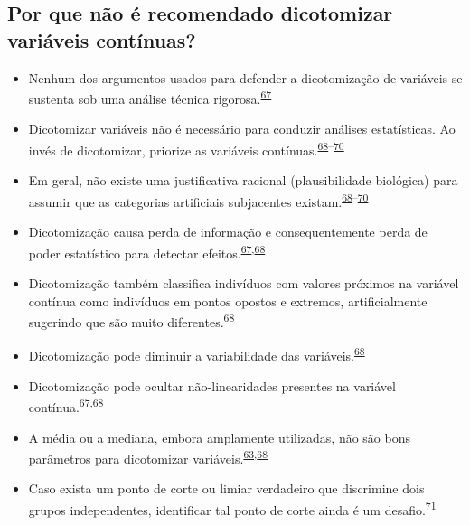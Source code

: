 \documentclass[
  a4paper,
]{book}
\begin{document}
\hypertarget{por-que-nuxe3o-uxe9-recomendado-dicotomizar-variuxe1veis-contuxednuas}{%
\subsection{Por que não é recomendado dicotomizar variáveis contínuas?}\label{por-que-nuxe3o-uxe9-recomendado-dicotomizar-variuxe1veis-contuxednuas}}

\begin{itemize}
\item
  Nenhum dos argumentos usados para defender a dicotomização de variáveis se sustenta sob uma análise técnica rigorosa.\textsuperscript{\protect\hyperlink{ref-MacCallum2002}{67}}
\item
  Dicotomizar variáveis não é necessário para conduzir análises estatísticas. Ao invés de dicotomizar, priorize as variáveis contínuas.\textsuperscript{\protect\hyperlink{ref-Altman2006}{68}--\protect\hyperlink{ref-Collins2016}{70}}
\item
  Em geral, não existe uma justificativa racional (plausibilidade biológica) para assumir que as categorias artificiais subjacentes existam.\textsuperscript{\protect\hyperlink{ref-Altman2006}{68}--\protect\hyperlink{ref-Collins2016}{70}}
\item
  Dicotomização causa perda de informação e consequentemente perda de poder estatístico para detectar efeitos.\textsuperscript{\protect\hyperlink{ref-MacCallum2002}{67},\protect\hyperlink{ref-Altman2006}{68}}
\item
  Dicotomização também classifica indivíduos com valores próximos na variável contínua como indivíduos em pontos opostos e extremos, artificialmente sugerindo que são muito diferentes.\textsuperscript{\protect\hyperlink{ref-Altman2006}{68}}
\item
  Dicotomização pode diminuir a variabilidade das variáveis.\textsuperscript{\protect\hyperlink{ref-Altman2006}{68}}
\item
  Dicotomização pode ocultar não-linearidades presentes na variável contínua.\textsuperscript{\protect\hyperlink{ref-MacCallum2002}{67},\protect\hyperlink{ref-Altman2006}{68}}
\item
  A média ou a mediana, embora amplamente utilizadas, não são bons parâmetros para dicotomizar variáveis.\textsuperscript{\protect\hyperlink{ref-Fedorov2009}{63},\protect\hyperlink{ref-Altman2006}{68}}
\item
  Caso exista um ponto de corte ou limiar verdadeiro que discrimine dois grupos independentes, identificar tal ponto de corte ainda é um desafio.\textsuperscript{\protect\hyperlink{ref-Prince2017}{71}}
\end{itemize}
\end{document}
